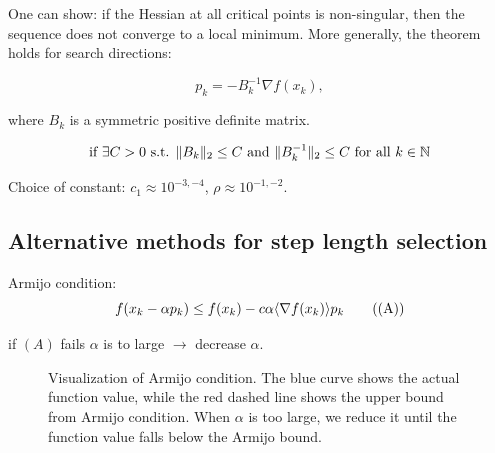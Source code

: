 One can show: if the Hessian at all critical points is non-singular, then the sequence does not converge to a local minimum.
More generally, the theorem holds for search directions:

\[
  p_k = - B_k^{-1} \nabla f(x_k),
\]

where  \(B_k\) is a symmetric positive definite matrix.

\[
  \text{if } \exists C > 0 \text{ s.t. } \lVert B_k\rVert_2 \leq C \text{ and } \lVert B_k^{-1}\rVert_2 \leq C \text{ for all } k \in \mathbb{N}
\]

Choice of constant:  \(c_1 \approx 10^{-3,-4}\),  \(\rho \approx 10^{-1,-2}\).

\subsection*{Alternative methods for step length selection}

Armijo condition:
\[
  f(x_k - \alpha p_k) \leq f(x_k) - c \alpha \langle\nabla f(x_k)\rangle{p_k} \tag{(A)}
\]

if  \((A)\) fails  \(\alpha\) is to large  \(\to\) decrease  \(\alpha\).

\begin{figure}[H]
  \centering
  \caption{Visualization of Armijo condition. The blue curve shows the actual function value, while the red dashed line shows the upper bound from Armijo condition. When  \(\alpha\) is too large, we reduce it until the function value falls below the Armijo bound.}
\end{figure}

